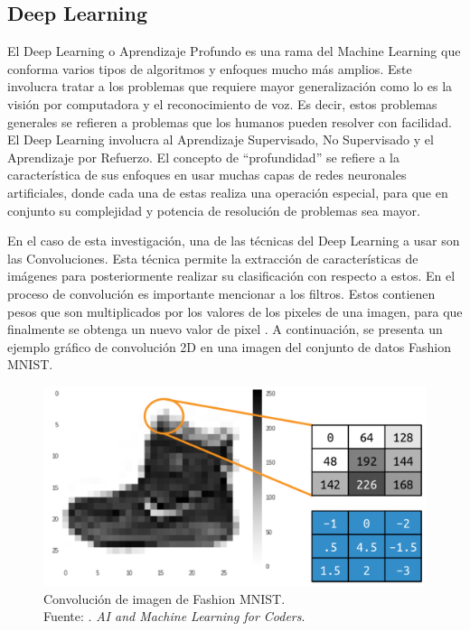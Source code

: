 \subsection{Deep Learning}

El Deep Learning o Aprendizaje Profundo es una rama del Machine Learning que conforma varios tipos de algoritmos y enfoques mucho más amplios. Este involucra tratar a los problemas que requiere mayor generalización como lo es la visión por computadora y el reconocimiento de voz. Es decir, estos problemas generales se refieren a problemas que los humanos pueden resolver con facilidad. El Deep Learning involucra al Aprendizaje Supervisado, No Supervisado y el Aprendizaje por Refuerzo. El concepto de “profundidad” se refiere a la característica de sus enfoques en usar muchas capas de redes neuronales artificiales, donde cada una de estas realiza una operación especial, para que en conjunto su complejidad y potencia de resolución de problemas sea mayor. \parencite{bk_hurbans2020grokking}

En el caso de esta investigación, una de las técnicas del Deep Learning a usar son las Convoluciones. Esta técnica permite la extracción de características de imágenes para posteriormente realizar su clasificación con respecto a estos. En el proceso de convolución es importante mencionar a los filtros. Estos contienen pesos que son multiplicados por los valores de los pixeles de una imagen, para que finalmente se obtenga un nuevo valor de pixel \parencite{bk_moroney2020aiandml}. A continuación, se presenta un ejemplo gráfico de convolución 2D en una imagen del conjunto de datos Fashion MNIST.

\begin{figure}[H]
	\begin{center}
		\includegraphics[width=1.00\textwidth]{2/figures/cnn_fash_mnist.png}
		\caption[Convolución de imagen de Fashion MNIST]{Convolución de imagen de Fashion MNIST. \\
		Fuente: \cite{bk_moroney2020aiandml}. \textit{AI and Machine Learning for Coders}.}
		\label{2:fig201}
	\end{center}
\end{figure}

